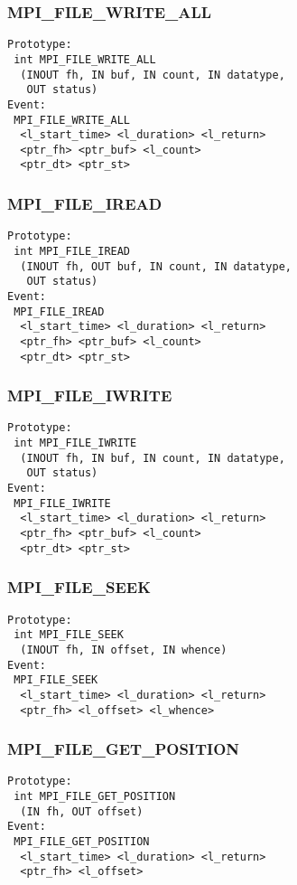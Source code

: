 \documentclass{article}
\begin{document}
\subsubsection{MPI\_FILE\_WRITE\_ALL}
\label{sec:MPIFILEWRITEALL}
\begin{verbatim}
Prototype:
 int MPI_FILE_WRITE_ALL
  (INOUT fh, IN buf, IN count, IN datatype, 
   OUT status)
Event:
 MPI_FILE_WRITE_ALL 
  <l_start_time> <l_duration> <l_return>
  <ptr_fh> <ptr_buf> <l_count>
  <ptr_dt> <ptr_st>
\end{verbatim}

\subsubsection{MPI\_FILE\_IREAD}
\label{sec:MPIFILEIREAD}
\begin{verbatim}
Prototype:
 int MPI_FILE_IREAD
  (INOUT fh, OUT buf, IN count, IN datatype, 
   OUT status)
Event:
 MPI_FILE_IREAD 
  <l_start_time> <l_duration> <l_return>
  <ptr_fh> <ptr_buf> <l_count>
  <ptr_dt> <ptr_st>
\end{verbatim}

\subsubsection{MPI\_FILE\_IWRITE}
\label{sec:MPIFILEIWRITE}
\begin{verbatim}
Prototype:
 int MPI_FILE_IWRITE
  (INOUT fh, IN buf, IN count, IN datatype, 
   OUT status)
Event:
 MPI_FILE_IWRITE 
  <l_start_time> <l_duration> <l_return>
  <ptr_fh> <ptr_buf> <l_count>
  <ptr_dt> <ptr_st>
\end{verbatim}

\subsubsection{MPI\_FILE\_SEEK}
\label{sec:MPIFILESEEK}
\begin{verbatim}
Prototype:
 int MPI_FILE_SEEK
  (INOUT fh, IN offset, IN whence)
Event:
 MPI_FILE_SEEK 
  <l_start_time> <l_duration> <l_return>
  <ptr_fh> <l_offset> <l_whence>
\end{verbatim}

\subsubsection{MPI\_FILE\_GET\_POSITION}
\label{sec:MPIFILEGETPOSITION}
\begin{verbatim}
Prototype:
 int MPI_FILE_GET_POSITION
  (IN fh, OUT offset)
Event:
 MPI_FILE_GET_POSITION 
  <l_start_time> <l_duration> <l_return>
  <ptr_fh> <l_offset>
\end{verbatim}
\end{document}
